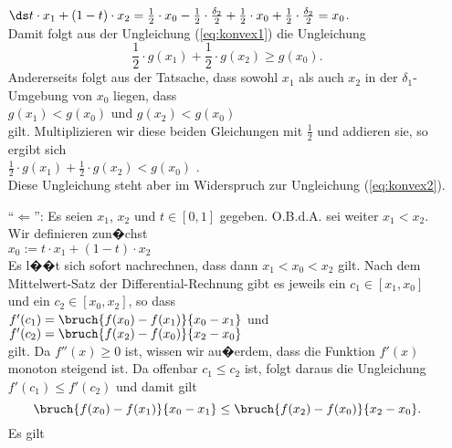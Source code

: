 \begin{enumerate}
  $\ds t \cdot x_1 + (1-t) \cdot x_2 = 
   \frac{1}{2} \cdot x_0 - \frac{1}{2} \cdot\frac{\delta_2}{2} + 
   \frac{1}{2} \cdot x_0 + \frac{1}{2} \cdot\frac{\delta_2}{2}
   = x_0
  $.
  \\[0.2cm]
  Damit folgt aus der Ungleichung (\ref{eq:konvex1}) die Ungleichung
  \begin{equation}
    \label{eq:konvex2}    
  \frac{1}{2} \cdot g(x_1) + \frac{1}{2} \cdot g(x_2) \geq g(x_0).
  \end{equation} 
  Andererseits folgt aus der Tatsache, dass sowohl $x_1$ als auch $x_2$ in der $\delta_1$-Umgebung von $x_0$
  liegen, dass
  \\[0.2cm]
  \hspace*{1.3cm}
  $g(x_1) < g(x_0)$ \quad und \quad  $g(x_2) < g(x_0)$
  \\[0.2cm]
  gilt. Multiplizieren wir diese beiden Gleichungen mit $\frac{1}{2}$ und addieren sie, so ergibt sich
  \\[0.2cm]
  \hspace*{1.3cm}
  $\frac{1}{2} \cdot g(x_1) + \frac{1}{2} \cdot g(x_2) < g(x_0)$ .
  \\[0.2cm]
  Diese Ungleichung steht aber im Widerspruch zur Ungleichung (\ref{eq:konvex2}).
\item[``$\Leftarrow$'':]  Es seien $x_1$, $x_2$ und $t \in [0,1]$ gegeben.  O.B.d.A. sei weiter
  $x_1 < x_2$. Wir definieren zun�chst
  \\[0.2cm]
  \hspace*{1.3cm}
  $x_0 := t \cdot x_1 + (1 - t) \cdot x_2$
  \\[0.2cm]
  Es l��t sich sofort nachrechnen, dass dann $x_1 < x_0 < x_2$ gilt.  Nach dem Mittelwert-Satz der
  Differential-Rechnung gibt es jeweils ein $c_1 \in [x_1,x_0]$ und ein $c_2 \in [x_0,x_2]$, so dass
  \\[0.2cm]
  \hspace*{1.3cm}
  $f'(c_1) = \bruch{f(x_0) - f(x_1)}{x_0 - x_1}$  \quad und \quad
  $f'(c_2) = \bruch{f(x_2) - f(x_0)}{x_2 - x_0}$  
  \\[0.2cm]
  gilt.  Da $f''(x) \geq 0$ ist, wissen wir au�erdem, dass die Funktion $f'(x)$ monoton steigend ist.
  Da offenbar $c_1 \leq c_2$ ist, folgt daraus die Ungleichung $f'(c_1) \leq f'(c_2)$ und damit gilt
  \begin{equation}
    \label{eq:konvex3}
    \bruch{f(x_0) - f(x_1)}{x_0 - x_1} \leq \bruch{f(x_2) - f(x_0)}{x_2 - x_0}.    
  \end{equation}
  Es gilt
  \\[0.2cm]

\end{enumerate}
